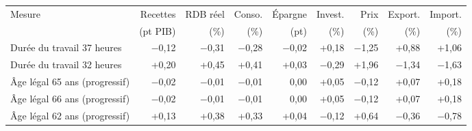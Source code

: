 \begin{tabular}{p{5.0cm}rrrrrrrr}
\toprule
Mesure & Recettes & RDB réel & Conso. & Épargne & Invest. & Prix & Export. & Import. \\
 & (pt PIB) & (\%) & (\%) & (pt) & (\%) & (\%) & (\%) & (\%) \\
\midrule
Durée du travail 37 heures & $-$0{,}12 & $-$0{,}31 & $-$0{,}28 & $-$0{,}02 & +0{,}18 & $-$1{,}25 & +0{,}88 & +1{,}06 \\
Durée du travail 32 heures & +0{,}20 & +0{,}45 & +0{,}41 & +0{,}03 & $-$0{,}29 & +1{,}96 & $-$1{,}34 & $-$1{,}63 \\
Âge légal 65 ans (progressif) & $-$0{,}02 & $-$0{,}01 & $-$0{,}01 & 0{,}00 & +0{,}05 & $-$0{,}12 & +0{,}07 & +0{,}18 \\
Âge légal 66 ans (progressif) & $-$0{,}02 & $-$0{,}01 & $-$0{,}01 & 0{,}00 & +0{,}05 & $-$0{,}12 & +0{,}07 & +0{,}18 \\
Âge légal 62 ans (progressif) & +0{,}13 & +0{,}38 & +0{,}33 & +0{,}04 & $-$0{,}12 & +0{,}64 & $-$0{,}36 & $-$0{,}78 \\
\bottomrule
\end{tabular}
